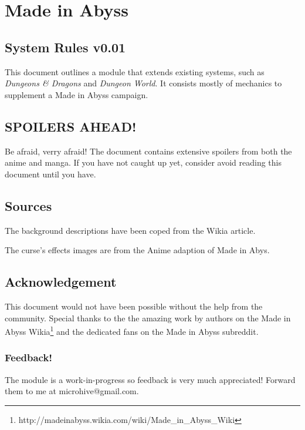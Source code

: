 \documentclass[letterpaper,10pt,twoside,twocolumn,openany]{book}
\begin{document}


\tableofcontents

\chapter{Made in Abyss}

\section{System Rules v0.01}
This document outlines a module that extends existing systems, such as \textit{Dungeons \& Dragons} and \textit{Dungeon World}. It consists mostly of mechanics to supplement a Made in Abyss campaign.

\section{SPOILERS AHEAD!} 
Be afraid, verry afraid! The document contains extensive spoilers from both the anime and manga. If you have not caught up yet, consider avoid reading this document until you have. 

\section{Sources}
The background descriptions have been coped from the Wikia article. 


\newline The curse's effects images are from the Anime adaption of Made in Abys.

\section{Acknowledgement}
This document would not have been possible without the help from the community. Special thanks to the the amazing work by authors on the Made in Abyss Wikia\footnote{http://madeinabyss.wikia.com/wiki/Made\_in\_Abyss\_Wiki} and the dedicated fans on the Made in Abyss subreddit. 

\subsection{Feedback!}
The module is a work-in-progress so feedback is very much appreciated! Forward them to me at microhive@gmail.com.

\end{document}
